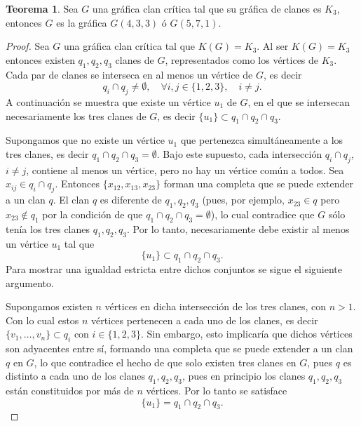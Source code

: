 \documentclass[12pt]{book}
\theoremstyle{definition}
\newtheorem{theorem}{Teorema}[chapter]
\begin{document}
\begin{theorem}
	Sea $G$ una gráfica clan crítica tal que su gráfica de clanes es $K_3$, entonces $G$ es la gráfica $G(4,3,3)$ ó $G(5,7,1)$.
\end{theorem}
\begin{proof}
Sea $G$ una gráfica clan crítica tal que $K(G)=K_3$. Al ser $K(G)=K_3$ entonces existen $q_1,q_2,q_3$ clanes de $G$, representados como los vértices de $K_3$. Cada par de clanes se interseca en al menos un vértice de $G$, es decir
\begin{equation*}
q_i\cap q_j\neq \emptyset, \quad \forall i,j\in\{1,2,3\},\quad i\neq j.
\end{equation*}
A continuación se muestra que existe un vértice $u_1$ de $G$, en el que se intersecan necesariamente los tres clanes de $G$, es decir $\{u_1\}\subset q_1\cap q_2 \cap q_3$. 

Supongamos que no existe un vértice $u_1$ que pertenezca simultáneamente a los tres clanes, es decir  $q_1\cap q_2 \cap q_3=\emptyset$. Bajo este supuesto, cada intersección $q_i\cap q_j$, $i\neq j$, contiene al menos un vértice, pero no hay un vértice común a todos. Sea $x_{ij}\in q_{i}\cap q_{j}$. Entonces $\{x_{12},x_{13},x_{23}\}$ forman una completa que se puede extender a un clan $q$. El clan $q$ es diferente de $q_{1},q_{2},q_{3}$ (pues, por ejemplo, $x_{23}\in q$ pero $x_{23}\not\in q_{1}$ por la condición de que $q_{1}\cap q_{2}\cap q_{3}=\emptyset$), lo cual contradice que $G$ sólo tenía los tres clanes $q_{1},q_{2},q_{3}$. 
Por lo tanto, necesariamente debe existir al menos un vértice $u_1$ tal que
\begin{equation*}
\{u_1\}\subset q_1\cap q_2 \cap q_3.
\end{equation*}
Para mostrar una igualdad estricta entre dichos conjuntos se sigue el siguiente argumento.

Supongamos existen $n$ vértices en dicha intersección de los tres clanes, con $n>1$. Con lo cual estos $n$ vértices pertenecen a cada uno de los clanes, es decir $\{v_1, \dots , v_n\} \subset q_i$ con $i\in\{1,2,3\}$. Sin embargo, esto implicaría que dichos vértices son adyacentes entre sí, formando una completa que se puede extender a un clan $q$ en $G$, lo que contradice el hecho de que solo existen tres clanes en $G$, pues $q$ es distinto a cada uno de los clanes $q_{1},q_{2},q_{3}$, pues en principio los clanes $q_{1},q_{2},q_{3}$ están constituidos por más de $n$ vértices. Por lo tanto se satisface 
\begin{equation*}
	\{u_1\}=q_1\cap q_2 \cap q_3.
\end{equation*}


\end{proof}
\end{document}

